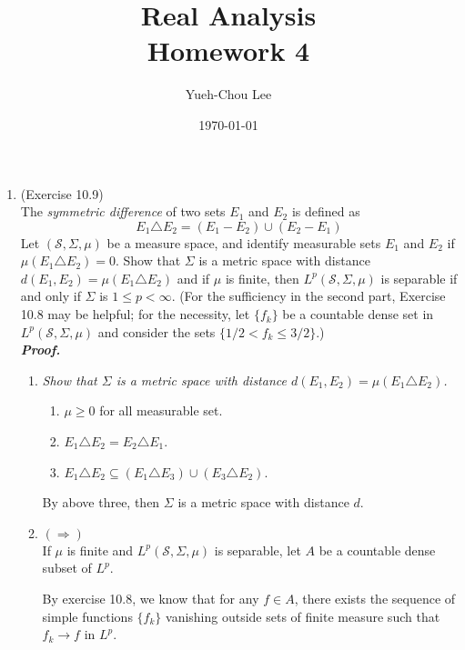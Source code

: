 \documentclass[a4paper,11pt]{article}
\title{Real Analysis \\ Homework 4}
\author{Yueh-Chou Lee}
\date{\today}
\begin{document}
\maketitle
\begin{enumerate}



	\item (Exercise 10.9)\\
		The \textit{symmetric difference} of two sets $E_1$ and $E_2$ is defined as
			$$E_1 \triangle E_2 = (E_1 - E_2) \cup (E_2 - E_1)$$
		Let $(\mathscr{S}, \Sigma, \mu)$ be a measure space, and identify measurable sets $E_1$ and $E_2$ if $\mu (E_1 \triangle E_2) = 0$. Show that $\Sigma$ is a metric space with distance $d(E_1,E_2) = \mu(E_1 \triangle E_2)$ and if $\mu$ is finite, then $L^p (\mathscr{S}, \Sigma, \mu)$ is separable if and only if $\Sigma$ is $1 \leq p < \infty$.  (For the sufficiency in the second part, Exercise 10.8 may be helpful; for the necessity, let $\{ f_k \}$ be a countable dense set in $L^p (\mathscr{S}, \Sigma, \mu)$ and consider the sets $\{1/2 < f_k \leq 3/2 \}$.)\\
	\newline
	\textit{\textbf {Proof.}}
	\begin{enumerate}
		\item \textit{Show that $\Sigma$ is a metric space with distance $d(E_1,E_2) = \mu(E_1 \triangle E_2)$.}\
		\begin{enumerate}
			\item $\mu \geq 0$ for all measurable set.

			\item $E_1 \triangle E_2 = E_2 \triangle E_1$.

			\item $E_1 \triangle E_2 \subseteq (E_1 \triangle E_3) \cup (E_3 \triangle E_2)$.\
		\end{enumerate}
		By above three, then $\Sigma$ is a metric space with distance $d$.\\

		\item
		$(\Rightarrow)$\\
			If $\mu$ is finite and $L^p (\mathscr{S}, \Sigma, \mu)$ is separable, let $A$ be a countable dense subset of $L^p$.\

			By exercise 10.8, we know that for any $f \in A$, there exists the sequence of simple functions $\{f_k\}$ vanishing outside sets of finite measure such that $f_k \to f$ in $L^p$.\\


\end{enumerate}
\end{enumerate}
\end{document}
